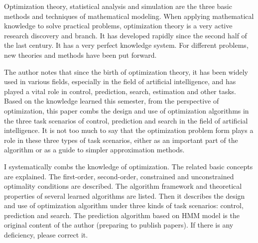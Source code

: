 \begin{abstracten}

Optimization theory, statistical analysis and simulation are the three basic methods and techniques of mathematical modeling. When applying mathematical knowledge to solve practical problems, optimization theory is a very active research discovery and branch. It has developed rapidly since the second half of the last century. It has a very perfect knowledge system. For different problems, new theories and methods have been put forward.



The author notes that since the birth of optimization theory, it has been widely used in various fields, especially in the field of artificial intelligence, and has played a vital role in control, prediction, search, estimation and other tasks. Based on the knowledge learned this semester, from the perspective of optimization, this paper combs the design and use of optimization algorithms in the three task scenarios of control, prediction and search in the field of artificial intelligence. It is not too much to say that the optimization problem form plays a role in these three types of task scenarios, either as an important part of the algorithm or as a guide to simpler approximation methods.



I systematically combs the knowledge of optimization. The related basic concepts are explained. The first-order, second-order, constrained and unconstrained optimality conditions are described. The algorithm framework and theoretical properties of several learned algorithms are listed. Then it describes the design and use of optimization algorithm under three kinds of task scenarios: control, prediction and search. The prediction algorithm based on HMM model is the original content of the author (preparing to publish papers). If there is any deficiency, please correct it.



\end{abstracten}

